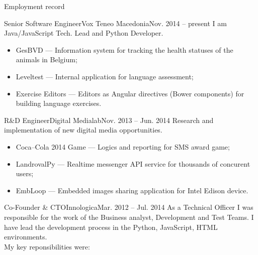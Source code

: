 \documentclass[]{mcdowellcv}
\begin{document}
    \makeheader
    \label{Contact}

    \begin{cvsection}{Employment record}
	\label{Employment Record}
        \begin{cvsubsection}{Senior Software Engineer}{Vox Teneo Macedonia}{Nov. 2014 -- present}
            I am Java/JavaScript Tech. Lead and Python Developer.
            \begin{itemize}
                \item GesBVD --- Information system for tracking the health statuses of the animals in Belgium;
                \item Leveltest --- Internal application for language assessment;
                \item Exercise Editors --- Editors as Angular directives (Bower components) for building language exercises.
            \end{itemize}
        \end{cvsubsection}
        \begin{cvsubsection}{R\&D Engineer}{Digital Medialab}{Nov. 2013 -- Jun. 2014}
            Research and implementation of new digital media opportunities.
            \begin{itemize}
                \item Coca--Cola 2014 Game --- Logics and reporting for SMS award game;
                \item LandrovalPy --- Realtime messenger API service for thousands of concurent users;
                \item EmbLoop --- Embedded images sharing application for Intel Edison device.
            \end{itemize}
        \end{cvsubsection}
        \begin{cvsubsection}{Co-Founder \& CTO}{Innologica}{Mar. 2012 -- Jul. 2014}
            As a Technical Officer I was responsible for the work of the Business analyst, Development and Test Teams.\linebreak
            I have lead the development process in the Python, JavaScript, HTML environments.\\
            My key reponsibilities were:
            \begin{itemize}

\end{itemize}
\end{cvsubsection}
\end{cvsection}
\end{document}
